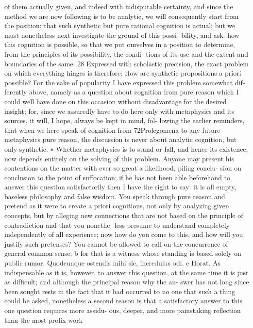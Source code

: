 of them actually given, and indeed with indisputable certainty, and since
the method we are now following is to be analytic, we will consequently
start from the position: that such synthetic but pure rational cognition is
actual; but we must nonetheless next investigate the ground of this possi-
bility, and ask: how this cognition is possible, so that we put ourselves in
a position to determine, from the principles of its possibility, the condi-
tions of its use and the extent and boundaries of the same. 28 Expressed
with scholastic precision, the exact problem on which everything hinges
is therefore:
How are synthetic propositions a priori possible?
For the sake of popularity I have expressed this problem somewhat dif-
ferently above, namely as a question about cognition from pure reason
which I could well have done on this occasion without disadvantage for
the desired insight; for, since we assuredly have to do here only with
metaphysics and its sources, it will, I hope, always be kept in mind, fol-
lowing the earlier reminders, that when we here speak of cognition from
72Prolegomena to any future metaphysics
pure reason, the discussion is never about analytic cognition, but only
synthetic. ∗
Whether metaphysics is to stand or fall, and hence its existence, now
depends entirely on the solving of this problem. Anyone may present his
contentions on the matter with ever so great a likelihood, piling conclu-
sion on conclusion to the point of suffocation; if he has not been able
beforehand to answer this question satisfactorily then I have the right
to say: it is all empty, baseless philosophy and false wisdom. You speak
through pure reason and pretend as it were to create a priori cognitions,
not only by analyzing given concepts, but by alleging new connections
that are not based on the principle of contradiction and that you nonethe-
less presume to understand completely independently of all experience;
now how do you come to this, and how will you justify such pretenses?
You cannot be allowed to call on the concurrence of general common
sense; b for that is a witness whose standing is based solely on public
rumor. Quodcunque ostendis mihi sic, incredulus odi. c Horat.
As indispensable as it is, however, to answer this question, at the same
time it is just as difﬁcult; and although the principal reason why the an-
swer has not long since been sought rests in the fact that it had occurred
to no one that such a thing could be asked, nonetheless a second reason
is that a satisfactory answer to this one question requires more assidu-
ous, deeper, and more painstaking reﬂection than the most prolix work
